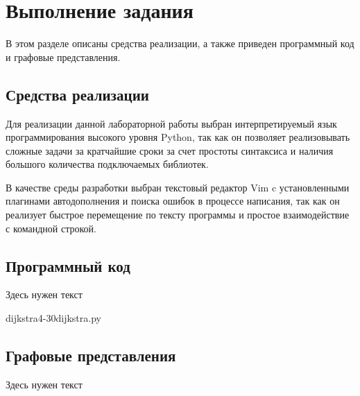 \chapter{Выполнение задания}

В этом разделе описаны средства реализации, а также приведен программный код и
графовые представления.

\section{Средства реализации}

Для реализации данной лабораторной работы выбран интерпретируемый язык
программирования высокого уровня Python\cite{python}, так как он позволяет
реализовывать сложные задачи за кратчайшие сроки за счет простоты синтаксиса и
наличия большого количества подключаемых библиотек. 

В качестве среды разработки выбран текстовый редактор Vim\cite{vim} c
установленными плагинами автодополнения и поиска ошибок в процессе написания,
так как он реализует быстрое перемещение по тексту программы и простое
взаимодействие с командной строкой.

\section{Программный код}

Здесь нужен текст

          {dijkstra}{4-30}{dijkstra.py}

\section{Графовые представления}

Здесь нужен текст

